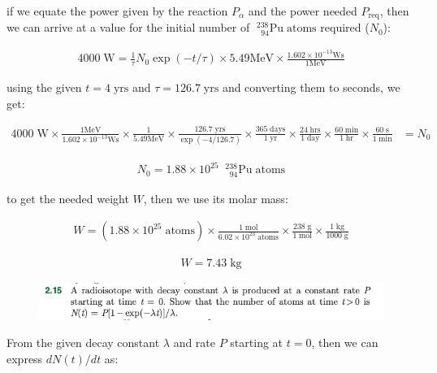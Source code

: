 \documentclass[11pt]{article}
\theoremstyle{definition}
\begin{document}
if we equate the power given by the reaction $P_{\alpha}$ and the power needed $P_{\text{req}}$, then we can arrive at a value for the initial number of $\; _{\;\;94}^{238}\text{Pu}\;\text{atoms}$ required ($N_0$):

\begin{align}
    4000\;\text{W} =\frac{1}{\tau} N_0 \exp(-t/\tau)\times 5.49 \text{MeV} \times \frac{1.602\times 10^{-13}\text{Ws}}{1\text{MeV}}
\end{align}

using the given $t=4\;\text{yrs}$ and $\tau =126.7\;\text{yrs}$ and converting them to seconds, we get:

\begin{align}
    4000\;\text{W} \times  
    \frac{1\text{MeV}}{1.602\times 10^{-13}\text{Ws}} \times 
    \frac{1}{5.49 \text{MeV}} \times \frac{126.7\;\text{yrs}}{\exp(-4/126.7)} \times \frac{365\;\text{days}}{1\;\text{yr}}\times \frac{24\;\text{hrs}}{1\;\text{day}} \times \frac{60\;\text{min}}{1\;\text{hr}}\times\frac{60\;\text{s}}{1\;\text{min}}  &=  N_0
\end{align}

\begin{align}
    N_0 = 1.88 \times 10^{25}\;\; _{\;\;94}^{238}\text{Pu}\;\text{atoms}
\end{align}

to get the needed weight $W$, then we use its molar mass: 

\begin{align}
    W = (1.88 \times 10^{25} \;\text{atoms})\times \frac{1\;\text{mol}}{6.02\times 10^{23}\;\text{atoms}} \times \frac{238\;\text{g}}{1\;\text{mol}} \times \frac{1\;\text{kg}}{1000\;\text{g}}
\end{align}

\begin{align}
\boxed{
    W = 7.43\;\text{kg}
}
\end{align}
\newpage
\setcounter{equation}{0}
\begin{figure}[h!]
    \centering
    \includegraphics[scale = 0.55]{2.15.png}
\end{figure}

From the given decay constant $\lambda$ and rate $P$ starting at $t=0$, then we can express $dN(t)/dt$ as:
\end{document}
